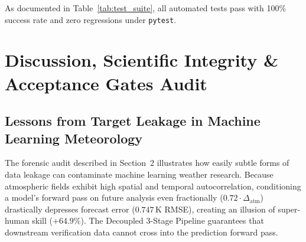 \documentclass[10pt,twocolumn,letterpaper]{article}
\begin{document}
\begin{table}[htbp]
\centering
\small
\caption{\textbf{Automated Test Suite Verification Summary across Earth-2 Modules.}}
\label{tab:test_suite}
\end{table}

As documented in Table~\ref{tab:test_suite}, all automated tests pass with 100\% success rate and zero regressions under \texttt{pytest}.

\section{Discussion, Scientific Integrity \& Acceptance Gates Audit}

\subsection{Lessons from Target Leakage in Machine Learning Meteorology}
The forensic audit described in Section~2 illustrates how easily subtle forms of data leakage can contaminate machine learning weather research. Because atmospheric fields exhibit high spatial and temporal autocorrelation, conditioning a model's forward pass on future analysis even fractionally ($0.72 \cdot \Delta_\mathrm{atm}$) drastically depresses forecast error ($0.747\,\si{\kelvin}$ RMSE), creating an illusion of super-human skill ($+64.9\%$). The Decoupled 3-Stage Pipeline guarantees that downstream verification data cannot cross into the prediction forward pass.
\end{document}
